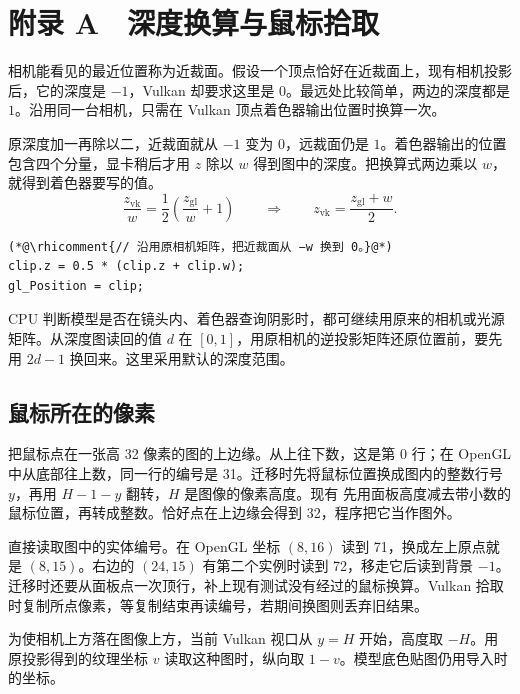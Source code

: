 \clearpage
\begingroup
\setlength{\parskip}{8pt}
\section{附录 A　深度换算与鼠标拾取}\label{app:coordinates}

相机能看见的最近位置称为近裁面。假设一个顶点恰好在近裁面上，现有相机投影后，它的深度是 $-1$，Vulkan 却要求这里是 $0$。最远处比较简单，两边的深度都是 $1$。沿用同一台相机，只需在 Vulkan 顶点着色器输出位置时换算一次。

原深度加一再除以二，近裁面就从 $-1$ 变为 $0$，远裁面仍是 $1$。着色器输出的位置包含四个分量，显卡稍后才用 $z$ 除以 $w$ 得到图中的深度。把换算式两边乘以 $w$，就得到着色器要写的值。
\[
  \frac{z_{\mathrm{vk}}}{w}=\frac{1}{2}\left(\frac{z_{\mathrm{gl}}}{w}+1\right)
  \qquad\Longrightarrow\qquad z_{\mathrm{vk}}=\frac{z_{\mathrm{gl}}+w}{2}.
\]
\begin{lstlisting}
(*@\rhicomment{// 沿用原相机矩阵，把近裁面从 −w 换到 0。}@*)
clip.z = 0.5 * (clip.z + clip.w);
gl_Position = clip;
\end{lstlisting}

CPU 判断模型是否在镜头内、着色器查询阴影时，都可继续用原来的相机或光源矩阵。从深度图读回的值 $d$ 在 $[0,1]$，用原相机的逆投影矩阵还原位置前，要先用 $2d-1$ 换回来。这里采用默认的深度范围。

\subsection{鼠标所在的像素}
把鼠标点在一张高 32 像素的图的上边缘。从上往下数，这是第 0 行；在 OpenGL 中从底部往上数，同一行的编号是 31。迁移时先将鼠标位置换成图内的整数行号 $y$，再用 $H-1-y$ 翻转，$H$ 是图像的像素高度。现有  先用面板高度减去带小数的鼠标位置，再转成整数。恰好点在上边缘会得到 32，程序把它当作图外。

 直接读取图中的实体编号。在 OpenGL 坐标 $(8,16)$ 读到 71，换成左上原点就是 $(8,15)$。右边的 $(24,15)$ 有第二个实例时读到 72，移走它后读到背景 $-1$。迁移时还要从面板点一次顶行，补上现有测试没有经过的鼠标换算。Vulkan 拾取时复制所点像素，等复制结束再读编号，若期间换图则丢弃旧结果。

为使相机上方落在图像上方，当前 Vulkan 视口从 $y=H$ 开始，高度取 $-H$。用原投影得到的纹理坐标 $v$ 读取这种图时，纵向取 $1-v$。模型底色贴图仍用导入时的坐标。

